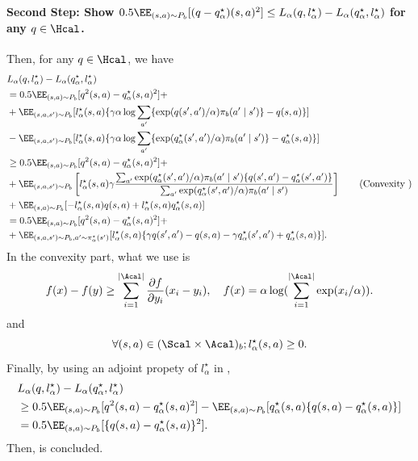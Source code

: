 \paragraph{Second Step: Show $0.5\EE_{(s,a)\sim P_b}[(q-q^{\star}_{\alpha})(s,a)^2]\leq L_{\alpha}(q,l^{\star}_{\alpha})-L_{\alpha}(q^{\star}_{\alpha},l^{\star}_{\alpha})$ for any $q \in \Hcal$. }

Then, for any $q \in \Hcal$, we have 
\begin{align*}
   &L_{\alpha}(q,l^{\star}_{\alpha})- L_{\alpha}(q^{\star}_{\alpha},l^{\star}_{\alpha})\\
   &=0.5 \EE_{(s,a) \sim P_b}[q^2(s,a)-q^{\star}_{\alpha}(s,a)^2] + \\
   &+ \EE_{(s,a,s')\sim P_b}[l^{\star}_{\alpha}(s,a)\{\gamma \alpha \log \sum_{a'}\{\exp(q(s',a')/\alpha)\pi_b(a'\mid s')\}-q(s,a) \}  ] \\
   &-\EE_{(s,a,s')\sim P_b}[l^{\star}_{\alpha}(s,a)\{\gamma \alpha\log \sum_{a'} \{ \exp(q^{\star}_{\alpha}(s',a')/\alpha)\pi_b(a'\mid s')\}-q^{\star}_{\alpha}(s,a) \}  ]  \\
   &\geq 0.5 \EE_{(s,a) \sim P_b}[q^2(s,a)-q^{\star}_{\alpha}(s,a)^2]  + \\
   &+\EE_{(s,a,s')\sim P_b}\left[l^{\star}_{\alpha}(s,a) \gamma \frac{\sum_{a'} \exp(q^{\star}_{\alpha}(s',a')/\alpha)\pi_b(a'\mid s')\{q(s',a')-q^{\star}_{\alpha}(s',a')\}}{\sum_{a'} \exp(q^{\star}_{\alpha}(s',a')/\alpha)\pi_b(a'\mid s')  } \right]  \tag{Convexity }  \\
   &+\EE_{(s,a) \sim P_b}[-l^{\star}_{\alpha}(s,a)q(s,a) + l^{\star}_{\alpha}(s,a)q^{\star}_{\alpha}(s,a) ] \\
   &=0.5 \EE_{(s,a) \sim P_b}[q^2(s,a)-q^{\star}_{\alpha}(s,a)^2]+  \\
   &+ \EE_{(s,a,s')\sim P_b,a'\sim \pi^{\star}_{\alpha}(s
')}[l^{\star}_{\alpha}(s,a)\{\gamma q(s',a')-q(s,a) - \gamma q^{\star}_{\alpha}(s',a') + q^{\star}_{\alpha}(s,a) \} ]. 
\end{align*}
In the convexity part, what we use is 
\begin{align*}
   f(x)-f(y)\geq \sum_{i=1}^{|\Acal|} \frac{\partial f}{\partial y_i}(x_i-y_i),\quad f(x)=\alpha \log(\sum_{i=1}^{|\Acal|} \exp(x_i/\alpha)). 
\end{align*}
and $$\forall (s,a)\in (\Scal \times \Acal)_b; l^{\star}_{\alpha}(s,a)\geq 0.$$ Finally, by using an adjoint propety of $l^{\star}_{\alpha}$ in , 
\begin{align*}
 & L_{\alpha}(q,l^{\star}_{\alpha})- L_{\alpha}(q^{\star}_{\alpha},l^{\star}_{\alpha})  \\ 
 & \geq 0.5 \EE_{(s,a) \sim P_b}[q^2(s,a)-q^{\star}_{\alpha}(s,a)^2]-\EE_{(s,a) \sim P_b}[q^{\star}_{\alpha}(s,a)\{q(s,a)-q^{\star}_{\alpha}(s,a)\}] \\ 
   &=0.5 \EE_{(s,a) \sim P_b}[\{q(s,a)-q^{\star}_{\alpha}(s,a) \}^2]. 
\end{align*}
Then,  is concluded. 

